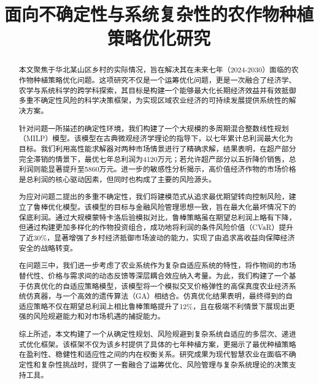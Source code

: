 \documentclass[withoutpreface,bwprint]{cumcmthesis} %
\title{面向不确定性与系统复杂性的农作物种植策略优化研究}
\begin{document}
\maketitle
\begin{abstract}

	本文聚焦于华北某山区乡村的实际情况，旨在解决其在未来七年（2024-2030）面临的农作物种植策略优化问题。这项研究不仅是一个运筹优化问题，更是一次融合了经济学、农学与系统科学的跨学科探索，其目标是构建一个能够最大化长期经济效益并有效抵御多重不确定性风险的科学决策框架，为实现区域农业经济的可持续发展提供系统性的解决方案。

	针对问题一所描述的确定性环境，我们构建了一个大规模的多周期混合整数线性规划（MILP）模型。该模型在古典微观经济学理论的指导下，以七年累计总利润最大化为目标。我们利用高性能求解器对两种市场情景进行了精确求解，结果表明，在超产部分完全滞销的情景下，最优七年总利润为4120万元；若允许超产部分以五折降价销售，总利润则能显著提升至5860万元。进一步的敏感性分析揭示，高价值经济作物的市场价格是总利润的核心驱动因素，但同时也构成了主要的风险源头。

	为应对问题二提出的多重不确定性，我们将建模范式从追求最优期望转向控制风险，建立了鲁棒优化模型。该模型的目标与金融风险管理思想一致，旨在最大化最坏情况下的保底利润。通过大规模蒙特卡洛后验模拟对比，鲁棒策略虽在期望总利润上略有下降，但通过构建更加多样化的作物投资组合，成功地将利润的条件风险价值（CVaR）提升了近30\%，显著增强了乡村经济抵御市场波动的能力，实现了由追求高收益向保障经济安全的战略转变。

	在问题三中，我们进一步考虑了农业系统作为复杂自适应系统的特性，将作物间的市场替代性、价格与需求间的动态反馈等深层耦合效应纳入考量。为此，我们构建了一个基于仿真优化的自适应策略模型，该模型将一个模拟交叉价格弹性的高保真度农业经济系统仿真器，与一个高效的遗传算法（GA）相结合。仿真优化结果表明，最终得到的自适应策略不仅在期望总利润上相比鲁棒策略提升了12\%，且在极端不利情景下展现出更强的风险规避能力和对市场机遇的捕捉能力。

	综上所述，本文构建了一个从确定性规划、风险规避到复杂系统自适应的多层次、递进式优化框架。该框架不仅为该乡村提供了具体的七年种植方案，更揭示了最优种植策略在盈利性、稳健性和适应性之间的内在权衡关系。研究成果为现代智慧农业在面临不确定性和复杂性挑战时，提供了一套融合了运筹优化、风险管理与复杂系统理论的决策支持工具。

\end{abstract}




\end{document}
